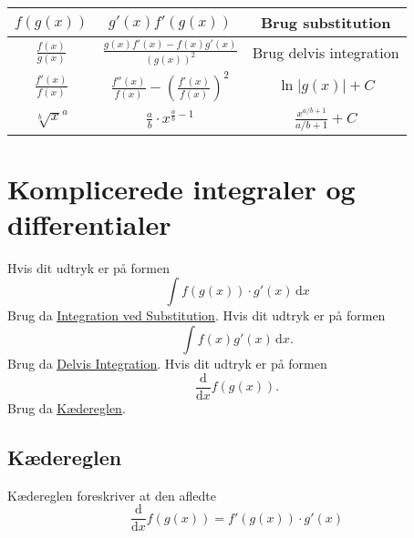 \begin{table}[ht]
\begin{tabular}{|c|c|c|}
$f(g(x))$          & $g'(x) f'(g(x))$                     & Brug substitution                                \\ \hline
$\frac{f(x)}{g(x)}$  & $\frac{g(x)f'(x) - f(x) g'(x)}{\left(g(x) \right)^2}$       & Brug delvis integration                                                               \\ \hline
$\frac{f'(x)}{f(x)}$ & $\frac{f''(x)}{f(x)} - \left( \frac{f'(x)}{f(x)} \right)^2$ & $\ln \left| g(x) \right| + C$                                                         \\ \hline
$\sqrt[b] x^a$     & $\frac{a}{b}\cdot x^{\frac{a}{b}-1}$ & $\frac{x^{a / b + 1}}{a / b + 1}  + C$           \\ \hline
\end{tabular}
\end{table}

\section{Komplicerede integraler og differentialer}
Hvis dit udtryk er på formen
\[ 
\int f \left( g(x) \right) \cdot g'(x) \, \mathrm{d}x 
\]
Brug da \underline{\hyperref[afs:intsub]{Integration ved Substitution}}. Hvis dit udtryk er på formen
\[
  \int f(x) g'(x) \, \mathrm{d}x 
.\]
Brug da \underline{\hyperref[afs:delint]{Delvis Integration}}. Hvis dit udtryk er på formen
\[ 
\frac{\mathrm{d}}{\mathrm{d}x} f(g(x))
.\]
Brug da \underline{\hyperref[afs:aflkæd]{Kædereglen}}.

\subsection{Kædereglen} \label{afs:aflkæd}
Kædereglen foreskriver at den afledte
\[ 
\frac{\mathrm{d}}{\mathrm{d}x} f \left( g(x) \right) = f' \left( g(x) \right) \cdot g'(x)
\]
